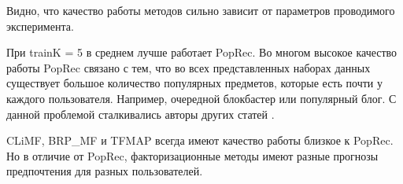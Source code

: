 \documentclass[14pt]{extarticle}
\begin{document}
\begin{table}[H]
\caption{Набор данных MobieLens 1m}
\label{tab:movm}
\end{table} 

Видно, что качество работы методов сильно зависит от параметров проводимого эксперимента. 

При trainK = 5 в среднем лучше работает PopRec. Во многом высокое качество работы PopRec связано с тем, что во всех представленных наборах данных существует большое количество популярных предметов, которые есть почти у каждого пользователя. Например, очередной блокбастер или  популярный блог. С данной проблемой сталкивались авторы других статей \cite{climf, reasonbadwork}.
 
 CLiMF, BRP\_MF и TFMAP всегда имеют качество работы близкое к PopRec. Но в отличие от PopRec, факторизационные методы имеют разные прогнозы предпочтения для разных пользователей.  
 
\end{document}

